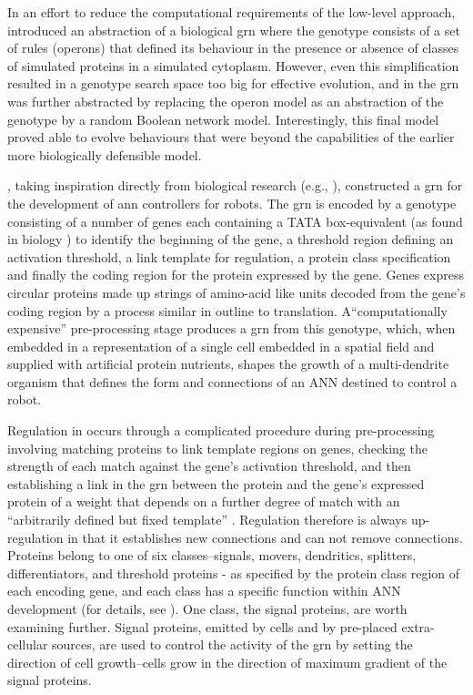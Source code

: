 In an effort to reduce the computational requirements of the low-level approach, \cite{Dellaert:1995po}
introduced an abstraction of a biological \gls{grn} where the genotype consists of a set of rules (operons) that defined
its behaviour in the presence or absence of classes of simulated proteins in a simulated cytoplasm. However, even this
simplification resulted in a genotype search space too big for effective evolution, and in \cite{Dellaert:1996ys} the
\gls{grn} was further abstracted by replacing the operon model as an abstraction of the genotype by a random Boolean
network model. Interestingly, this final model proved able to evolve behaviours that were beyond the capabilities of the
earlier more biologically defensible model.

\cite{Jakobi:1995py}, taking inspiration directly from biological research (e.g., \cite{Kauffman:1969ne}), constructed a \gls{grn} for the development of \gls{ann} controllers for robots. The \gls{grn} is encoded by a genotype consisting of a number of genes each containing a TATA box-equivalent (as found in biology \cite[pg. 397]{Watson:2008fm}) to identify the beginning of the gene, a threshold region defining an activation threshold, a link template for regulation, a protein class specification and finally the coding region for the protein expressed by the gene. Genes express circular proteins made up strings of amino-acid like units decoded from the gene's coding region by a process similar in outline to \gls{translation}.  A``computationally expensive'' \parencite[sec. 4.2]{Jakobi:1995py} pre-processing stage produces a \gls{grn} from this genotype, which, when embedded in a representation of a single cell embedded in a spatial field and supplied with artificial protein nutrients, shapes the growth of a multi-dendrite organism that
defines the form and connections of an ANN destined to control a robot.

Regulation in \cite{Jakobi:1995py} occurs through a complicated procedure during pre-processing involving matching
proteins to link template regions on genes, checking the strength of each match against the gene's activation threshold,
and then establishing a link in the \gls{grn} between the protein and the gene's expressed protein of a weight that depends on
a further degree of match with an ``arbitrarily defined but fixed template'' \parencite[sec. 4.2]{Jakobi:1995py}.
Regulation therefore is always up-regulation in that it establishes new connections and can not remove connections.
Proteins belong to one of six classes--signals, movers, dendritics, splitters, differentiators, and threshold proteins
- as specified by the protein class region of each encoding gene, and each class has a specific function within ANN
development (for details, see \cite[sec. 4.3]{Jakobi:1995py}). One class, the signal proteins, are worth examining
further. Signal proteins, emitted by cells and by pre-placed extra-cellular sources, are used to control the activity of
the \gls{grn} by setting the direction of cell growth--cells grow in the direction of maximum gradient of the signal
proteins.

